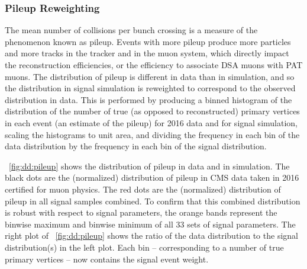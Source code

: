 \subsubsection{Pileup Reweighting}
\label{sec:dd:pileup}
The mean number of \pp collisions per bunch crossing is a measure of the phenomenon known as pileup.
Events with more pileup produce more particles and more tracks in the tracker and in the muon system, which directly impact \eg the reconstruction efficiencies, or the efficiency to associate DSA muons with PAT muons.
The distribution of pileup is different in data than in simulation, and so the distribution in signal simulation is reweighted to correspond to the observed distribution in data. 
This is performed by producing a binned histogram of the distribution of the number of true (as opposed to reconstructed) primary vertices in each event (an estimate of the pileup) for 2016 data and for signal simulation, scaling the histograms to unit area, and dividing the frequency in each bin of the data distribution by the frequency in each bin of the signal distribution.

\Fig~\ref{fig:dd:pileup} shows the distribution of pileup in data and in simulation.
The black dots are the (normalized) distribution of pileup in CMS data taken in 2016 certified for muon physics.
The red dots are the (normalized) distribution of pileup in all \twoMu signal samples combined.
To confirm that this combined distribution is robust with respect to signal parameters, the orange bands represent the binwise maximum and binwise minimum of all 33 sets of signal parameters.
The right plot of \Fig~\ref{fig:dd:pileup} shows the ratio of the data distribution to the signal distribution(s) in the left plot.
Each bin -- corresponding to a number of true primary vertices -- now contains the signal event weight.

